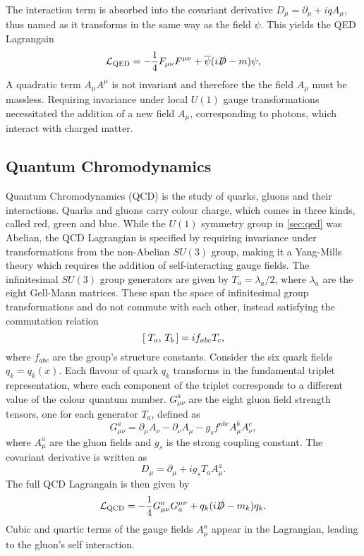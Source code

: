 The interaction term is absorbed into the covariant derivative $D_\mu = \partial_\mu + i q A_\mu$, thus named as it transforms in the same way as the field $\psi$.
This yields the QED Lagrangain
%
\begin{equation}\label{eq:qed_lagrangian}
  \mathcal{L}_{\textnormal{QED}} = -\frac{1}{4} F_{\mu\nu} F^{\mu\nu} + \overline{\psi} (i \slashed{D} - m )\psi ,
\end{equation}
%
A quadratic term $A_\mu A^\mu$ is not invariant and therefore the the field $A_\mu$ must be massless.
Requiring invariance under local $U(1)$ gauge transformations necessitated the addition of a new field $A_\mu$, corresponding to photons, which interact with charged matter. 


\subsection{Quantum Chromodynamics}\label{sec:qcd}

Quantum Chromodynamics (QCD) is the study of quarks, gluons and their interactions.
Quarks and gluons carry colour charge, which comes in three kinds, called red, green and blue.
While the $U(1)$ symmetry group in \cref{sec:qed} was Abelian, the QCD Lagrangian is specified by requiring invariance under transformations from the non-Abelian $SU(3)$ group, making it a Yang\nobreakdash-Mills theory \cite{PhysRev.96.191} which requires the addition of self-interacting gauge fields.
The infinitesimal $SU(3)$ group generators are given by $T_a = \lambda_a / 2$, where $\lambda_a$ are the eight Gell\nobreakdash-Mann matrices.
These span the space of infinitesimal group transformations and do not commute with each other, instead satisfying the commutation relation
%
\begin{equation}
  [\; T_a,\,T_b\,] = i f_{abc} T_c ,
\end{equation}
%
where $f_{abc}$ are the group's structure constants.
Consider the six quark fields $q_k = q_k(x)$.
Each flavour of quark $q_k$ transforms in the fundamental triplet representation, where each component of the triplet corresponds to a different value of the colour quantum number.
$G^{a}_{\mu\nu}$ are the eight gluon field strength tensors, one for each generator $T_a$, defined as
%
\begin{equation}\label{eq:qcd_field_strength_tensor}
  G^a_{\mu\nu} = \partial_\mu A_\nu - \partial_\nu A_\mu - g_s f^{abc} A_\mu^b A_\nu^c ,
\end{equation}
%
where $A_\mu^a$ are the gluon fields and $g_s$ is the strong coupling constant. The covariant derivative is written as
%
\begin{equation}\label{eq:qcd_covariant_derivative}
  D_\mu = \partial_\mu + i g_s T_a A_\mu^a .
\end{equation}
%
The full QCD Lagrangain is then given by
%
\begin{equation}\label{eq:qcd_lagrangian}
  \mathcal{L}_\textnormal{QCD} = 
  - \frac{1}{4} G^{a}_{\mu\nu} G_{a}^{\mu\nu}
  + q_k (i \slashed{D} - m_k) q_k .
\end{equation}
%
Cubic and quartic terms of the gauge fields $A^a_\mu$ appear in the Lagrangian, leading to the gluon's self interaction.

